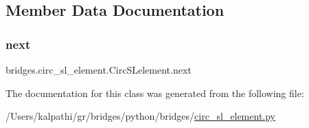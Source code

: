 \subsection{Member Data Documentation}
\mbox{\label{classbridges_1_1circ__sl__element_1_1_circ_s_lelement_afc8fa34bcbc539e7966db5ec471e3959}} 
\subsubsection{\texorpdfstring{next}{next}}
{\footnotesize\ttfamily bridges.\+circ\+\_\+sl\+\_\+element.\+Circ\+S\+Lelement.\+next}



The documentation for this class was generated from the following file\+:\begin{DoxyCompactItemize}
\item 
/\+Users/kalpathi/gr/bridges/python/bridges/\mbox{\hyperlink{circ__sl__element_8py}{circ\+\_\+sl\+\_\+element.\+py}}\end{DoxyCompactItemize}
